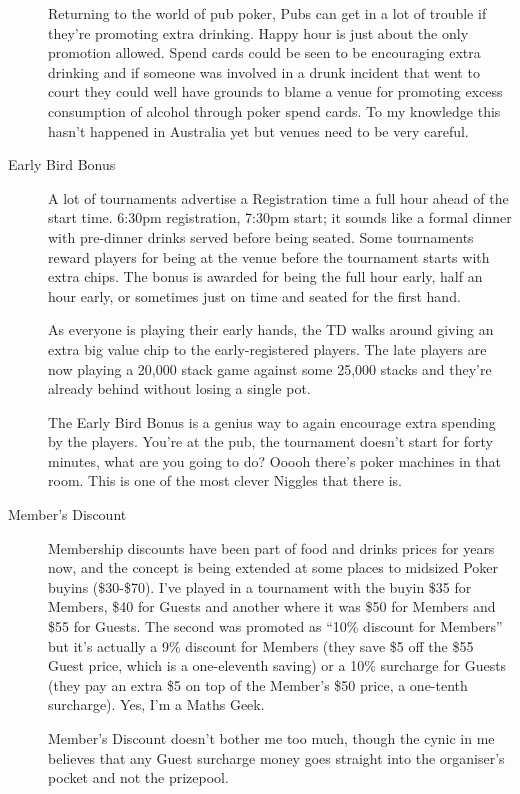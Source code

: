 \begin{description}
Returning to the world of pub poker, Pubs can get in a lot of trouble
if they're promoting extra drinking. Happy hour is just about the only
promotion allowed. Spend cards could be seen to be encouraging
extra drinking and if someone was involved in a drunk incident
that went to court they could well have grounds to blame a venue for
promoting excess consumption of alcohol through poker
spend cards. To my knowledge this hasn't happened in Australia yet
but venues need to be very careful.

\item[Early Bird Bonus] A lot of tournaments advertise a Registration
time a full hour ahead of the start time. 6:30pm registration, 7:30pm
start; it sounds like a formal dinner with pre-dinner drinks served
before being seated. Some tournaments reward players for being
at the venue before the tournament starts with extra
chips. The bonus is awarded for being the full hour early, half an
hour early, or sometimes just on time and seated for the first hand.

As everyone is playing their early hands, the TD walks around
giving an extra big value chip to the early-registered players. The
late players are now playing a 20,000 stack game against some
25,000 stacks and they're already behind without losing a single pot.

The Early Bird Bonus is a genius way to again encourage extra
spending by the players. You're at the pub, the tournament doesn't
start for forty minutes, what are you going to do? Ooooh there's poker
machines in that room. This is one of the most clever Niggles that
there is.

\item[Member's Discount] Membership discounts have been part
of food and drinks prices for years now, and the concept
is being extended at some places to midsized Poker buyins
(\$30-\$70). I've played in a tournament with the buyin
\$35 for Members, \$40 for Guests and another where it was \$50
for Members and \$55 for Guests. The second was promoted as ``10\%
discount for Members'' but it's actually a 9\% discount for Members
(they save \$5 off the \$55 Guest price, which is a one-eleventh saving)
or a 10\% surcharge for Guests (they pay an extra \$5 on top of the
Member's \$50 price, a one-tenth surcharge). Yes, I'm a Maths Geek.

Member's Discount doesn't bother me too much, though the
cynic in me believes that any Guest surcharge money
goes straight into the organiser's pocket and not the prizepool.


\end{description}
